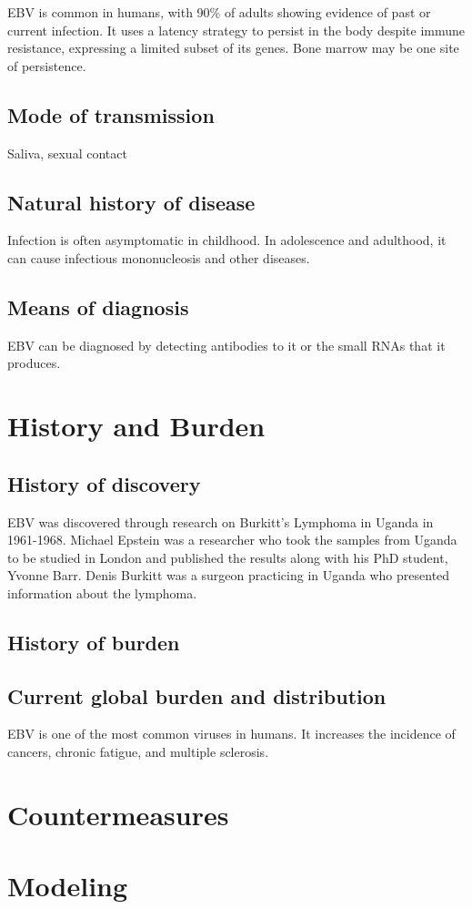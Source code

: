 \documentclass{article}
\begin{document}
EBV is common in humans, with 90\% of adults showing evidence of past or current infection. It uses a latency strategy to persist in the body despite immune resistance, expressing a limited subset of its genes. Bone marrow may be one site of persistence.

\subsection{Mode of transmission}

Saliva, sexual contact

\subsection{Natural history of disease}

Infection is often asymptomatic in childhood. In adolescence and adulthood, it can cause infectious mononucleosis and other diseases.

\subsection{Means of diagnosis}

EBV can be diagnosed by detecting antibodies to it or the small RNAs that it produces.

\section{History and Burden}

\subsection{History of discovery}

EBV was discovered through research on Burkitt's Lymphoma in Uganda in 1961-1968. Michael Epstein was a researcher who took the samples from Uganda to be studied in London and published the results along with his PhD student, Yvonne Barr. Denis Burkitt was a surgeon practicing in Uganda who presented information about the lymphoma.

\subsection{History of burden}

\subsection{Current global burden and distribution}

EBV is one of the most common viruses in humans. It increases the incidence of cancers, chronic fatigue, and multiple sclerosis.

\section{Countermeasures}

\section{Modeling}
\end{document}
